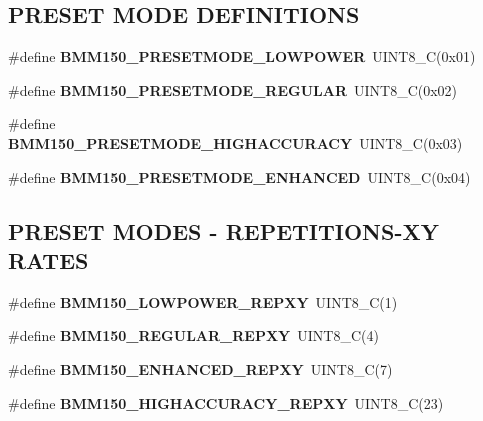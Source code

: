 \subsection*{P\+R\+E\+S\+ET M\+O\+DE D\+E\+F\+I\+N\+I\+T\+I\+O\+NS}
\begin{DoxyCompactItemize}
\item 
\mbox{\label{group___b_m_m150_ga53d45f7abf598fb71d42b9b802527b38}} 
\#define {\bfseries B\+M\+M150\+\_\+\+P\+R\+E\+S\+E\+T\+M\+O\+D\+E\+\_\+\+L\+O\+W\+P\+O\+W\+ER}~U\+I\+N\+T8\+\_\+C(0x01)
\item 
\mbox{\label{group___b_m_m150_ga0a5b6e8ffa9b48919a9249391e8adf6c}} 
\#define {\bfseries B\+M\+M150\+\_\+\+P\+R\+E\+S\+E\+T\+M\+O\+D\+E\+\_\+\+R\+E\+G\+U\+L\+AR}~U\+I\+N\+T8\+\_\+C(0x02)
\item 
\mbox{\label{group___b_m_m150_gae42ffc1cb14641aace57f88405accfee}} 
\#define {\bfseries B\+M\+M150\+\_\+\+P\+R\+E\+S\+E\+T\+M\+O\+D\+E\+\_\+\+H\+I\+G\+H\+A\+C\+C\+U\+R\+A\+CY}~U\+I\+N\+T8\+\_\+C(0x03)
\item 
\mbox{\label{group___b_m_m150_gabe068b7f463f2d0792dfec9cf789356b}} 
\#define {\bfseries B\+M\+M150\+\_\+\+P\+R\+E\+S\+E\+T\+M\+O\+D\+E\+\_\+\+E\+N\+H\+A\+N\+C\+ED}~U\+I\+N\+T8\+\_\+C(0x04)
\end{DoxyCompactItemize}
\subsection*{P\+R\+E\+S\+ET M\+O\+D\+ES -\/ R\+E\+P\+E\+T\+I\+T\+I\+O\+N\+S-\/\+XY R\+A\+T\+ES}
\begin{DoxyCompactItemize}
\item 
\mbox{\label{group___b_m_m150_ga07a88e2e2f239df21553d8d2d3fd95ad}} 
\#define {\bfseries B\+M\+M150\+\_\+\+L\+O\+W\+P\+O\+W\+E\+R\+\_\+\+R\+E\+P\+XY}~U\+I\+N\+T8\+\_\+C(1)
\item 
\mbox{\label{group___b_m_m150_ga189401c65c20987dae0f7e321e72e67d}} 
\#define {\bfseries B\+M\+M150\+\_\+\+R\+E\+G\+U\+L\+A\+R\+\_\+\+R\+E\+P\+XY}~U\+I\+N\+T8\+\_\+C(4)
\item 
\mbox{\label{group___b_m_m150_ga64544c94f65746a876d6479eb3ae42c9}} 
\#define {\bfseries B\+M\+M150\+\_\+\+E\+N\+H\+A\+N\+C\+E\+D\+\_\+\+R\+E\+P\+XY}~U\+I\+N\+T8\+\_\+C(7)
\item 
\mbox{\label{group___b_m_m150_gaf6800e431a1e315906bc9a8c9e172756}} 
\#define {\bfseries B\+M\+M150\+\_\+\+H\+I\+G\+H\+A\+C\+C\+U\+R\+A\+C\+Y\+\_\+\+R\+E\+P\+XY}~U\+I\+N\+T8\+\_\+C(23)
\end{DoxyCompactItemize}
